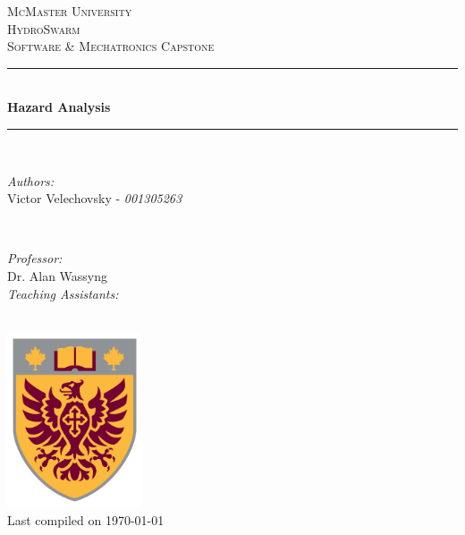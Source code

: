 \documentclass[11pt]{article}
\begin{document}
\begin{titlepage}
	\newcommand{\HRule}{\rule{\linewidth}{0.2mm}}
	\begin{center}
	\textsc{\LARGE McMaster University}\\[1.5cm]

	\textsc{\Large HydroSwarm}\\[0.5cm]
	\textsc{\large Software \& Mechatronics Capstone}\\[0.5cm]

	\HRule\\[0.4cm]
		{\huge\bfseries Hazard Analysis}\\[0.4cm]
	\HRule\\[0.4cm]

	\begin{minipage}[t][][t]{0.5\textwidth}
		\begin{flushleft} \large
			\emph{Authors:}\\
			Victor Velechovsky - \textit{001305263} \\
		\end{flushleft}
	\end{minipage}
	~
	\begin{minipage}[t][][t]{0.4\textwidth}
		\begin{flushright} \large
			\emph{Professor:} \\
			Dr. Alan Wassyng \\[0.4cm]
			\emph{Teaching Assistants:} \\
		\end{flushright}
	\end{minipage}\\[2cm]

	\includegraphics[width=0.3\textwidth]{logo.png} \\
	{\large Last compiled on \today}
	\end{center}

\end{titlepage}

\tableofcontents
\listoffigures
\end{document}
